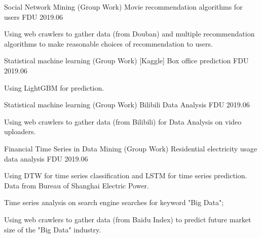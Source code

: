\begin{cventries}
  \cventry
    {Social Network Mining (Group Work)}
    {Movie recommendation algorithms for users}
    {FDU}
    {2019.06}
    {
      \begin{cvitems} %
        \item {Using web crawlers to gather data (from Douban) and multiple recommendation algorithms to make reasonable choices of recommendation to users.}
      \end{cvitems}
    }

  \cventry
    {Statistical machine learning (Group Work)}
    {[Kaggle] Box office prediction}
    {FDU}
    {2019.06}
    {
      \begin{cvitems} %
        \item {Using LightGBM for prediction.}
      \end{cvitems}
    }

  \cventry
    {Statistical machine learning (Group Work)}
    {Bilibili Data Analysis}
    {FDU}
    {2019.06}
    {
      \begin{cvitems} %
        \item {Using web crawlers to gather data (from Bilibili) for Data Analysis on video uploaders.}
      \end{cvitems}
    }

  \cventry
    {Financial Time Series in Data Mining (Group Work)}
    {Residential electricity usage data analysis}
    {FDU}
    {2019.06}
    {
      \begin{cvitems} %
        \item {Using DTW for time series classification and LSTM for time series prediction. Data from Bureau of Shanghai Electric Power.}
        \item {Time series analysis on search engine searches for keyword "Big Data";}
        \item {Using web crawlers to gather data (from Baidu Index) to predict future market size of the "Big Data" industry.}
      \end{cvitems}
    }

\end{cventries}
